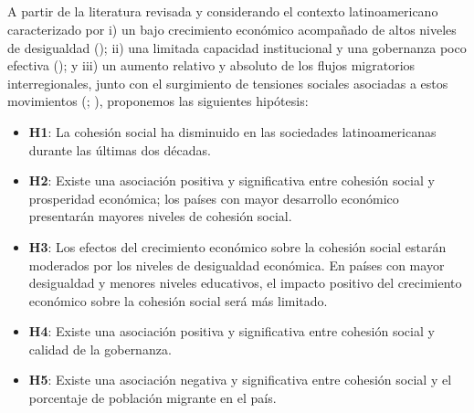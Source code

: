 \documentclass[
  letterpaper,
  DIV=11,
  numbers=noendperiod]{scrartcl}
\begin{document}
\subsection{}\label{section}

A partir de la literatura revisada y considerando el contexto
latinoamericano caracterizado por i) un bajo crecimiento económico
acompañado de altos niveles de desigualdad
(); ii) una limitada capacidad institucional y una gobernanza poco
efectiva
(); y iii) un aumento relativo y absoluto de los flujos migratorios
interregionales, junto con el surgimiento de tensiones sociales
asociadas a estos movimientos
(;
),
proponemos las siguientes hipótesis:

\begin{itemize}
\item
  \textbf{H1}: La cohesión social ha disminuido en las sociedades
  latinoamericanas durante las últimas dos décadas.
\item
  \textbf{H2}: Existe una asociación positiva y significativa entre
  cohesión social y prosperidad económica; los países con mayor
  desarrollo económico presentarán mayores niveles de cohesión social.
\item
  \textbf{H3}: Los efectos del crecimiento económico sobre la cohesión
  social estarán moderados por los niveles de desigualdad económica. En
  países con mayor desigualdad y menores niveles educativos, el impacto
  positivo del crecimiento económico sobre la cohesión social será más
  limitado.
\item
  \textbf{H4}: Existe una asociación positiva y significativa entre
  cohesión social y calidad de la gobernanza.
\item
  \textbf{H5}: Existe una asociación negativa y significativa entre
  cohesión social y el porcentaje de población migrante en el país.
\end{itemize}
\end{document}
